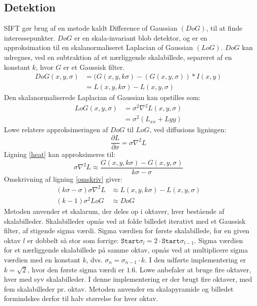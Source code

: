 \subsection{Detektion}
SIFT gør brug af en metode kaldt Difference of Gaussian $(DoG)$, til at finde interessepunkter. $DoG$ er en skala-invariant blob detektor, og er en approksimation til en skalanormaliseret Laplacian of Gaussian $(LoG)$. $DoG$ kan udregnes, ved en subtraktion af et nærliggende skalabillede, separeret af en konstant $k$, hvor $G$ er et Gaussisk filter.
\begin{equation}
\begin{split}
DoG(x,y,\sigma) &= (G(x,y,k\sigma)-(G(x,y,\sigma))\ast I(x,y) \\
           &= L(x,y,k \sigma)-L(x,y,\sigma)
\end{split}
\label{dog}
\end{equation}
Den skalanormaliserede Laplacian of Gaussian kan opstilles som:
\begin{equation}
\begin{split}
LoG(x,y,\sigma)&=\sigma^2\nabla^2L(x,y,\sigma) \\
&= \sigma^2(L_{xx}+L{yy})
\end{split}
\end{equation}
Lowe relatere approksimeringen af $DoG$ til $LoG$, ved diffusions ligningen:
\begin{equation}
\dfrac{\partial L}{\partial \sigma} = \sigma \nabla^2L
\label{heat}
\end{equation}
Ligning \eqref{heat} kan approksimeres til:
\begin{equation}
\sigma \nabla^2L \approx \frac{G(x,y,k\sigma) - G(x,y,\sigma)}{k\sigma-\sigma}
\label{omskriv}
\end{equation}
Omskrivning af ligning \eqref{omskriv} giver:
\begin{equation}
\begin{split}
(k\sigma-\sigma)\sigma\nabla^2L &\approx L(x,y,k\sigma)-L(x,y,\sigma) \\
(k-1)\sigma^2LoG &\approx DoG
\end{split}
\end{equation}
Metoden anvender et skalarum, der deles op i oktaver, hver bestående af skalabilleder. Skalabilleder opnås ved at folde billedet iterativt med et Gaussisk filter, af stigende sigma værdi. Sigma værdien for første skalabillede, for en given oktav $l$ er dobbelt så stor som forrige: $\texttt{Start} \sigma_l = 2 \cdot \texttt{Start} \sigma_{l-1}$. Sigma værdien for et nærliggende skalabillede på samme oktav, opnås ved at multiplicere sigma værdien med en konstant $k$, dvs. $\sigma_n = \sigma_{n-1} \cdot k$. I den udførte implementering er $k=\sqrt{2}$, hvor den første sigma værdi er $1.6$. Lowe anbefaler at bruge fire oktaver, hver med syv skalabilleder. I denne implementering er der brugt fire oktaver, med fem skalabilleder pr. oktav. Metoden anvender en skalapyramide og billedet formindskes derfor til halv størrelse for hver oktav. \\ 
